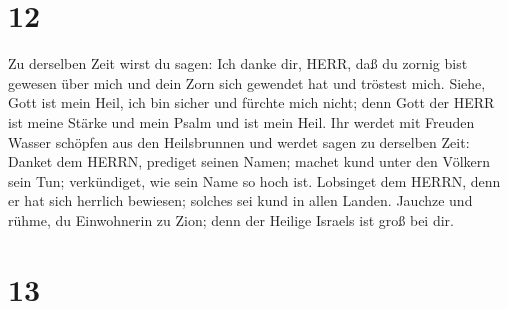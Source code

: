 \hypertarget{section-11}{%
\section{12}\label{section-11}}

 Zu derselben Zeit wirst du sagen: Ich danke dir, HERR, daß
du zornig bist gewesen über mich und dein Zorn sich gewendet hat und
tröstest mich.  Siehe, Gott ist mein Heil, ich bin sicher
und fürchte mich nicht; denn Gott der HERR ist meine Stärke und mein
Psalm und ist mein Heil.  Ihr werdet mit Freuden Wasser
schöpfen aus den Heilsbrunnen  und werdet sagen zu derselben
Zeit: Danket dem HERRN, prediget seinen Namen; machet kund unter den
Völkern sein Tun; verkündiget, wie sein Name so hoch ist. 
Lobsinget dem HERRN, denn er hat sich herrlich bewiesen; solches sei
kund in allen Landen.  Jauchze und rühme, du Einwohnerin zu
Zion; denn der Heilige Israels ist groß bei dir.

\hypertarget{section-12}{%
\section{13}\label{section-12}}

